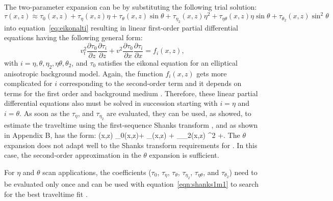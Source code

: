  The two-parameter expansion can be   by substituting the following trial solution:
 \begin{equation}
 \tau(x,z) \approx \tau_{0}(x,z) +\tau_{\eta}(x,z) \eta+\tau_{\theta}(x,z) \sin\theta+ \tau_{\eta_2}(x,z)  \eta^{2}+ \tau_{\eta \theta}(x,z)  \eta \sin\theta+ \tau_{\theta_2}(x,z)  \sin^{2}\theta
\label{eqn:n0ee}
\end{equation}
into equation~\ref{eq:eikonalti} resulting in linear first-order partial differential equations having the following general form:
\begin{equation}
v_t^2 \frac{\partial \tau _{0}}{\partial z} \frac{\partial \tau _i}{\partial z}+
v^2 \frac{\partial \tau _{0}}{\partial x} \frac{\partial \tau _i}{\partial x} =
f_i(x,z),
\label{eqn:allorder}
\end{equation}
with $i=\eta,\theta,\eta_2,\eta \theta,\theta_2$, and $\tau_{0}$ satisfies the eikonal equation for an
 elliptical anisotropic background model. Again, the function
 $f_i(x,z)$ gets more complicated for $i$ corresponding to the
 second-order term and it depends on terms for the first order and
 background medium . 
Therefore, these linear partial differential equations also must be solved in succession 
starting with $i=\eta$ and $i=\theta$. As soon as
the $\tau_{\eta}$,  and $\tau_{\eta_2}$   are evaluated, they can be used, as  \cite{etascan} showed,
 to estimate the traveltime using the first-sequence  Shanks transform \cite[]{Bender},
and as shown in Appendix B, has the form:
\beq
\tau(x,z) \approx \tau_{0}(x,z)+ \tau_{\theta}(x,z) \sin\theta+ \tau_{\theta_2}(x,z)  \sin^{2}\theta
+.
\label{eqn:shanks1m1}
\eeq
The $\theta$ expansion does not adapt well to the Shanks transform
requirements for  .
In this case, the second-order approximation in the $\theta$ expansion
is sufficient.

 For $\eta$ and $\theta$ scan
applications, the coefficients ($\tau_{0}$, $\tau_{\eta}$, $\tau_{\theta}$, $\tau_{\eta_2}$, $\tau_{\eta \theta}$, and $\tau_{\theta_2}$) 
need to be evaluated only once and can be used with 
equation~\ref{eqn:shanks1m1} to search for the best traveltime fit
.



